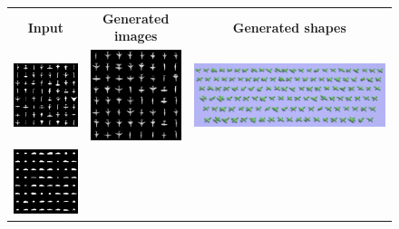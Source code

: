 \begin{figure}
  \newcommand{\fh}{0.19\linewidth}
  \begin{center}
  \setlength{\tabcolsep}{3pt}
  \begin{tabular}{ccc}
    \textbf{Input} & \textbf{Generated images} & \textbf{Generated shapes} \\
    \includegraphics[height=\fh]{fig/airplane/samples.png} & 
    \includegraphics[height=\fh]{fig/airplane/100.png} & 
    \includegraphics[height=\fh]{fig/airplane/output.png} \\
    \includegraphics[height=\fh]{fig/car/samples.png} & 

\end{tabular}
\end{center}
\end{figure}
